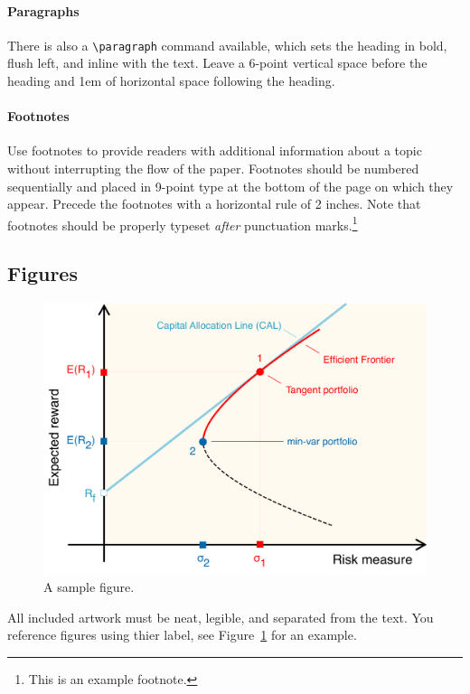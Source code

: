 \documentclass{article}
\begin{document}
\paragraph{Paragraphs}
There is also a \verb+\paragraph+ command available, which sets the heading in bold, flush left, and inline with the text.
Leave a 6-point vertical space before the heading and 1em of horizontal space following the heading.

\paragraph{Footnotes}
Use footnotes to provide readers with additional information about a topic without interrupting the flow of the paper.
Footnotes should be numbered sequentially and placed in 9-point type at the bottom of the page on which they appear.
Precede the footnotes with a horizontal rule of 2 inches.
Note that footnotes should be properly typeset \emph{after} punctuation marks.\footnote{This is an example footnote.}

\subsection{Figures}
\begin{figure}
	\centering
	\includegraphics[width=0.5\linewidth]{./figs/Fig-Markowitz-Risk-Free-Asset-Example.pdf}
	\caption{A sample figure.}
	\label{fig:sample}
\end{figure}

All included artwork must be neat, legible, and separated from the text. You reference figures using thier label, see Figure~\ref{fig:sample} for an example.
\end{document}
